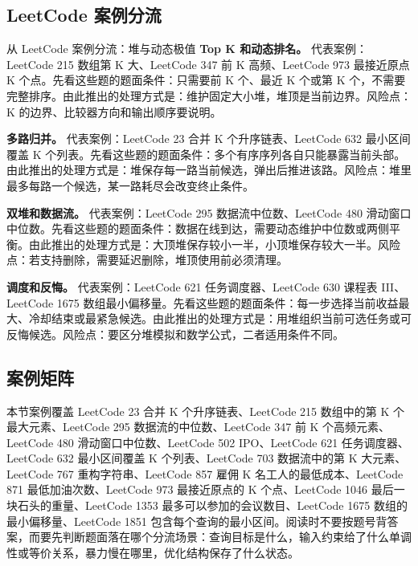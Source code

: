 \subsection{LeetCode 案例分流}

\begin{principlebox}{从 LeetCode 案例分流：堆与动态极值}
\textbf{Top K 和动态排名。}
代表案例：LeetCode 215 数组第 K 大、LeetCode 347 前 K 高频、LeetCode 973 最接近原点 K 个点。先看这些题的题面条件：只需要前 K 个、最近 K 个或第 K 个，不需要完整排序。由此推出的处理方式是：维护固定大小堆，堆顶是当前边界。风险点：K 的边界、比较器方向和输出顺序要说明。

\textbf{多路归并。}
代表案例：LeetCode 23 合并 K 个升序链表、LeetCode 632 最小区间覆盖 K 个列表。先看这些题的题面条件：多个有序序列各自只能暴露当前头部。由此推出的处理方式是：堆保存每一路当前候选，弹出后推进该路。风险点：堆里最多每路一个候选，某一路耗尽会改变终止条件。

\textbf{双堆和数据流。}
代表案例：LeetCode 295 数据流中位数、LeetCode 480 滑动窗口中位数。先看这些题的题面条件：数据在线到达，需要动态维护中位数或两侧平衡。由此推出的处理方式是：大顶堆保存较小一半，小顶堆保存较大一半。风险点：若支持删除，需要延迟删除，堆顶使用前必须清理。

\textbf{调度和反悔。}
代表案例：LeetCode 621 任务调度器、LeetCode 630 课程表 III、LeetCode 1675 数组最小偏移量。先看这些题的题面条件：每一步选择当前收益最大、冷却结束或最紧急候选。由此推出的处理方式是：用堆组织当前可选任务或可反悔候选。风险点：要区分堆模拟和数学公式，二者适用条件不同。

\end{principlebox}

\subsection{案例矩阵}

本节案例覆盖 LeetCode 23 合并 K 个升序链表、LeetCode 215 数组中的第 K 个最大元素、LeetCode 295 数据流的中位数、LeetCode 347 前 K 个高频元素、LeetCode 480 滑动窗口中位数、LeetCode 502 IPO、LeetCode 621 任务调度器、LeetCode 632 最小区间覆盖 K 个列表、LeetCode 703 数据流中的第 K 大元素、LeetCode 767 重构字符串、LeetCode 857 雇佣 K 名工人的最低成本、LeetCode 871 最低加油次数、LeetCode 973 最接近原点的 K 个点、LeetCode 1046 最后一块石头的重量、LeetCode 1353 最多可以参加的会议数目、LeetCode 1675 数组的最小偏移量、LeetCode 1851 包含每个查询的最小区间。阅读时不要按题号背答案，而要先判断题面落在哪个分流场景：查询目标是什么，输入约束给了什么单调性或等价关系，暴力慢在哪里，优化结构保存了什么状态。

